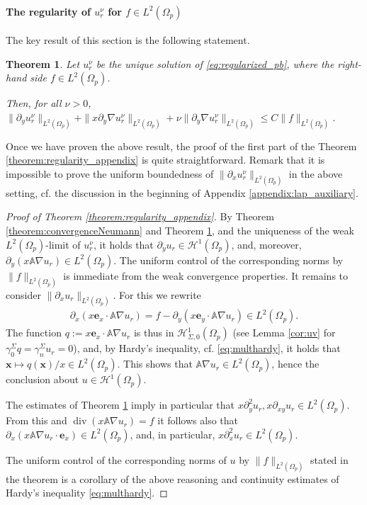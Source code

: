 \documentclass[report]{elsarticle}
\newtheorem{theorem}{Theorem}[section]
\numberwithin{theorem}{section}
\renewcommand{\vec}[1]{\mathbf{#1}}
\begin{document}
\paragraph{The regularity of $u^{\nu}_r$ for $f\in L^2(\Omega_p)$}
The key result of this section is the following statement.
\begin{theorem}
	\label{theorem:regularNeumann}
	Let $u^{\nu}_r$ be the unique solution of \eqref{eq:regularized_pb}, where the right-hand side $f\in L^2(\Omega_p)$. 
	
	
	Then, for all $\nu>0$, $\|\partial_y u^{\nu}_r\|_{L^2(\Omega_p)}+\|x\partial_y \nabla u^{\nu}_r\|_{L^2(\Omega_p)}+\nu\|\partial_y \nabla u^{\nu}_r\|_{L^2(\Omega_p)}\leq C\|f\|_{L^2(\Omega_p)}$. 
	
\end{theorem}
Once we have proven the above result, the proof of the first part of the Theorem \ref{theorem:regularity_appendix} is quite straightforward. Remark that it is impossible to prove the uniform boundedness of $\|\partial_x u^{\nu}_r\|_{L^2(\Omega_p)}$ in the above setting, cf. the discussion in the beginning of Appendix \ref{appendix:lap_auxiliary}.
\begin{proof}[Proof of Theorem \ref{theorem:regularity_appendix}]
	By Theorem \ref{theorem:convergenceNeumann} and Theorem \ref{theorem:regularNeumann}, and the uniqueness of the weak $L^2(\Omega_p)$-limit of $u^{\nu}_r$, it holds that $\partial_y u_r\in \mathcal{H}^1(\Omega_p)$, and, moreover, $\partial_y (x\mathbb{A}\nabla u_r)\in L^2(\Omega_p)$. The uniform control of the corresponding norms by $\|f\|_{L^2(\Omega_p)}$ is immediate from the weak convergence properties. It remains to consider $\|\partial_x u_r\|_{L^2(\Omega_p)}$. For this we rewrite 
	\begin{align*}
		\partial_x(x\vec{e}_x\cdot\mathbb{A}\nabla u_r)=f-\partial_y(x\vec{e}_y\cdot\mathbb{A}\nabla u_r)\in L^2(\Omega_p).
	\end{align*}
The function $q:=x\vec{e}_x\cdot \mathbb{A}\nabla u_r$ is thus in $\mathcal{H}^1_{\Sigma,0}(\Omega_p)$ (see Lemma \ref{cor:uv} for $\gamma^{\Sigma}_0q=\gamma_n^{\Sigma}u_r=0$), and, by Hardy's inequality, cf. \eqref{eq:multhardy}, it holds that $\vec{x}\mapsto q(\vec{x})/x\in L^2(\Omega_p)$. This shows that $\mathbb{A}\nabla u_r\in L^2(\Omega_p)$, hence the conclusion about $u\in \mathcal{H}^1(\Omega_p)$. 


The estimates of Theorem \ref{theorem:regularNeumann} imply in particular that $x\partial_y^2 u_r, x\partial_{xy}u_r\in L^2(\Omega_p)$. From this and  $\operatorname{div}(x\mathbb{A}\nabla u_r)=f$ it follows also that $\partial_x(x\mathbb{A}\nabla u_r\cdot\vec{e}_x)\in L^2(\Omega_p)$, and, in particular, $x\partial_x^2 u_r\in L^2(\Omega_p)$. 


The uniform control of the corresponding norms of $u$ by $\|f\|_{L^2(\Omega_p)}$ stated in the theorem is a corollary of the above reasoning and continuity estimates of Hardy's inequality \eqref{eq:multhardy}. 

\end{proof}
\end{document}
